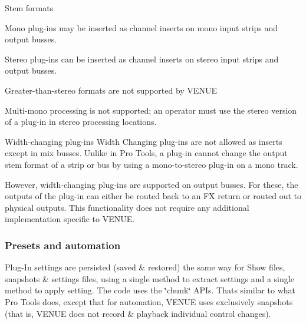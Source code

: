  Stem formats 
\begin{DoxyItemize}
\item Mono plug-\/ins may be inserted as channel inserts on mono input strips and output busses. 
\item Stereo plug-\/ins can be inserted as channel inserts on stereo input strips and output busses. 
\item Greater-\/than-\/stereo formats are not supported by V\+E\+N\+UE 
\item Multi-\/mono processing is not supported; an operator must use the stereo version of a plug-\/in in stereo processing locations. 
\end{DoxyItemize}

 Width-\/changing plug-\/ins Width Changing plug-\/ins are not allowed as inserts except in mix busses. Unlike in Pro Tools, a plug-\/in cannot change the output stem format of a strip or bus by using a mono-\/to-\/stereo plug-\/in on a mono track.

 However, width-\/changing plug-\/ins are supported on output busses. For these, the outputs of the plug-\/in can either be routed back to an FX return or routed out to physical outputs. This functionality does not require any additional implementation specific to V\+E\+N\+UE.

\hypertarget{a00849_subsection__aax_venue_guide__features__presets}{}\subsubsection{Presets and automation}\label{a00849_subsection__aax_venue_guide__features__presets}
 Plug-\/\+In settings are persisted (saved \& restored) the same way for Show files, snapshots \& settings files, using a single method to extract settings and a single method to apply setting. The code uses the \char`\"{}chunk\char`\"{} A\+P\+Is. That\textquotesingle{}s similar to what Pro Tools does, except that for automation, V\+E\+N\+UE uses exclusively snapshots (that is, V\+E\+N\+UE does not record \& playback individual control changes).

